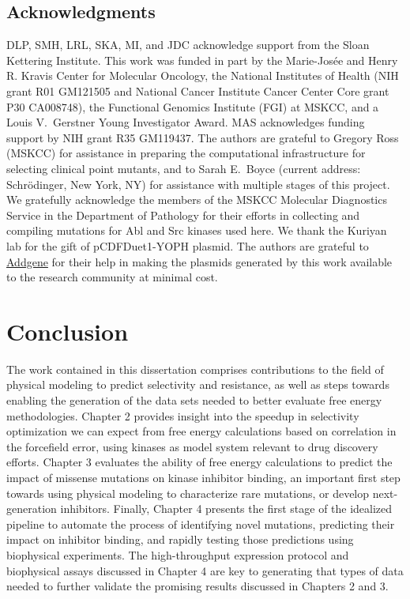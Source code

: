 \documentclass[phd,tocprelim]{cornell}
\begin{document}
\section{Acknowledgments}

DLP, SMH, LRL, SKA, MI, and JDC acknowledge support from the Sloan Kettering Institute.
This work was funded in part by the Marie-Josée and Henry R. Kravis Center for Molecular Oncology, the National Institutes of Health (NIH grant R01 GM121505 and National Cancer Institute Cancer Center Core grant P30 CA008748), the Functional Genomics Institute (FGI) at MSKCC, and a Louis V.~Gerstner Young Investigator Award. 
MAS acknowledges funding support by NIH grant R35 GM119437. 
The authors are grateful to Gregory Ross (MSKCC) for assistance in preparing the computational infrastructure for selecting clinical point mutants, and to Sarah E.~Boyce (current address: Schr\"{o}dinger, New York, NY) for assistance with multiple stages of this project.
We gratefully acknowledge the members of the MSKCC Molecular Diagnostics Service in the Department of Pathology for their efforts in collecting and compiling mutations for Abl and Src kinases used here.
We thank the Kuriyan lab for the gift of pCDFDuet1-YOPH plasmid.
The authors are grateful to \href{http://www.addgene.org}{Addgene} for their help in making the plasmids generated by this work available to the research community at minimal cost.


\chapter{Conclusion}

The work contained in this dissertation comprises contributions to the field of physical modeling to predict selectivity and resistance, as well as steps towards enabling the generation of the data sets needed to better evaluate free energy methodologies. Chapter 2 provides insight into the speedup in selectivity optimization we can expect from free energy calculations based on correlation in the forcefield error, using kinases as model system relevant to drug discovery efforts. Chapter 3 evaluates the ability of free energy calculations to predict the impact of missense mutations on kinase inhibitor binding, an important first step towards using physical modeling to characterize rare mutations, or develop next-generation inhibitors. Finally, Chapter 4 presents the first stage of the idealized pipeline to automate the process of identifying novel mutations, predicting their impact on inhibitor binding, and rapidly testing those predictions using biophysical experiments. The high-throughput expression protocol and biophysical assays discussed in Chapter 4 are key to generating that types of data needed to further validate the promising results discussed in Chapters 2 and 3. 
\end{document}
